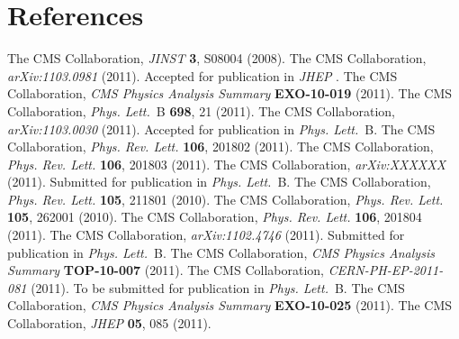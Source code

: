 \documentclass[11pt]{article}
\def\Journal#1#2#3#4{{#1} {\bf #2}, #3 (#4)}
\def\PLB{{\em Phys. Lett.}~B}
\def\PRL{\em Phys. Rev. Lett.}
\def\PRD{{\em Phys. Rev.}~D}
\def\JINST{{\em JINST} }
\def\JHEP{{\em JHEP} }
\begin{document}
\section*{References}
\begin{thebibliography}{99}

The CMS Collaboration, \Journal{\JINST}{3}{S08004}{2008}.
The CMS Collaboration, {\em arXiv:1103.0981} (2011). Accepted for publication in \JHEP.
The CMS Collaboration, {\em CMS Physics Analysis Summary} {\bf EXO-10-019} (2011).
The CMS Collaboration, \Journal{\PLB}{698}{21}{2011}.
The CMS Collaboration, {\em arXiv:1103.0030} (2011). Accepted for publication in \PLB.
The CMS Collaboration, \Journal{\PRL}{106}{201802}{2011}.
The CMS Collaboration, \Journal{\PRL}{106}{201803}{2011}.
The CMS Collaboration, {\em arXiv:XXXXXX} (2011). Submitted for publication in \PLB.
The CMS Collaboration, \Journal{\PRL}{105}{211801}{2010}.
The CMS Collaboration, \Journal{\PRL}{105}{262001}{2010}.
The CMS Collaboration, \Journal{\PRL}{106}{201804}{2011}.
The CMS Collaboration, {\em arXiv:1102.4746} (2011). Submitted for publication in \PLB.
The CMS Collaboration, {\em CMS Physics Analysis Summary} {\bf TOP-10-007} (2011).
The CMS Collaboration, {\em CERN-PH-EP-2011-081} (2011). To be submitted for publication in \PLB.
The CMS Collaboration, {\em CMS Physics Analysis Summary} {\bf EXO-10-025} (2011).
The CMS Collaboration, \Journal{\JHEP}{05}{085}{2011}.




\end{thebibliography}
\end{document}
